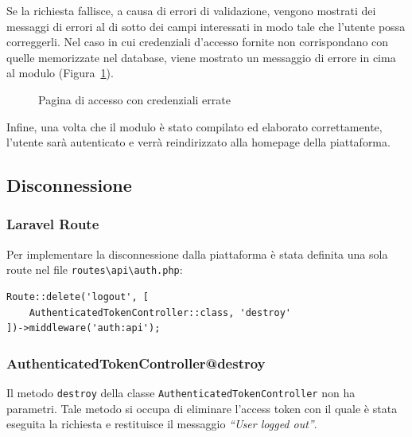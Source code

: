 Se la richiesta fallisce, a causa di errori di validazione, vengono mostrati dei messaggi di errori al di sotto dei campi interessati in modo tale che l'utente possa correggerli. Nel caso in cui credenziali d'accesso fornite non corrispondano con quelle memorizzate nel database, viene mostrato un messaggio di errore in cima al modulo (Figura~\ref{fig:sign_in_page_error}).
\begin{figure}[htbp]
	\centering
	\fboxsep=0.5pt
	\fboxrule=0.5pt
	\caption{Pagina di accesso con credenziali errate}
	\label{fig:sign_in_page_error}
\end{figure}

Infine, una volta che il modulo \`e stato compilato ed elaborato correttamente, l'utente sar\`a autenticato e verr\`a reindirizzato alla homepage della piattaforma.
\subsection{Disconnessione}
\subsubsection{Laravel Route}
Per implementare la disconnessione dalla piattaforma \`e stata definita una sola route nel file \verb|routes\api\auth.php|:
\begin{lstlisting}[caption={Route per la disconnessione}, label={lst:route_logout}]
Route::delete('logout', [
	AuthenticatedTokenController::class, 'destroy'
])->middleware('auth:api');
\end{lstlisting}

\subsubsection{AuthenticatedTokenController@destroy}
Il metodo \verb|destroy| della classe \verb|AuthenticatedTokenController| non ha parametri. Tale metodo si occupa di eliminare l'access token con il quale \`e stata eseguita la richiesta e restituisce il messaggio \textit{``User logged out''}.

